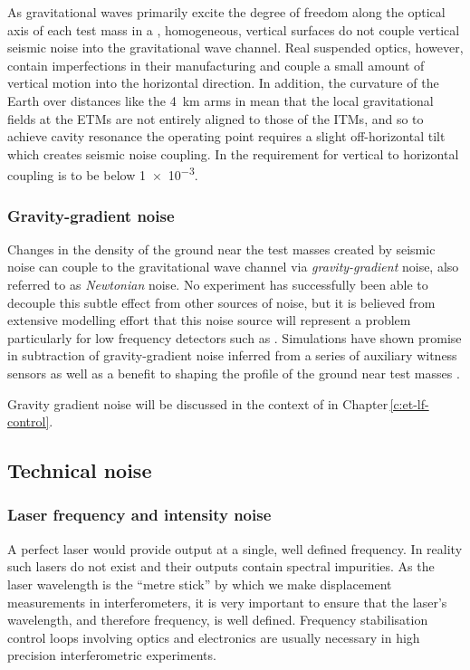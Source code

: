 As gravitational waves primarily excite the degree of freedom along the optical axis of each test mass in a \MI{}, homogeneous, vertical surfaces do not couple vertical seismic noise into the gravitational wave channel. Real suspended optics, however, contain imperfections in their manufacturing and couple a small amount of vertical motion into the horizontal direction. In addition, the curvature of the Earth over distances like the \SI{4}{\kilo\meter} arms in \ALIGO{} mean that the local gravitational fields at the \glspl{ETM} are not entirely aligned to those of the \glspl{ITM}, and so to achieve cavity resonance the operating point requires a slight off-horizontal tilt which creates seismic noise coupling. In \ALIGO{} the requirement for vertical to horizontal coupling is to be below \num{1e-3}.

\subsubsection{\label{sec:gravity-gradient-noise}Gravity-gradient noise}
Changes in the density of the ground near the test masses created by seismic noise can couple to the gravitational wave channel via \emph{gravity-gradient} noise, also referred to as \emph{Newtonian} noise. No experiment has successfully been able to decouple this subtle effect from other sources of noise, but it is believed from extensive modelling effort that this noise source will represent a problem particularly for low frequency detectors such as \ETLF{} \cite{ET2011, Hild2011}. Simulations have shown promise in subtraction of gravity-gradient noise inferred from a series of auxiliary witness sensors \cite{Harms2015} as well as a benefit to shaping the profile of the ground near test masses \cite{Harms2014}.

Gravity gradient noise will be discussed in the context of \ETLF{} in Chapter\,\ref{c:et-lf-control}.

\subsection{Technical noise}

\subsubsection{\label{sec:laser-noise}Laser frequency and intensity noise}
A perfect laser would provide output at a single, well defined frequency. In reality such lasers do not exist and their outputs contain spectral impurities. As the laser wavelength is the ``metre stick'' by which we make displacement measurements in interferometers, it is very important to ensure that the laser's wavelength, and therefore frequency, is well defined. Frequency stabilisation control loops involving optics and electronics are usually necessary in high precision interferometric experiments.

